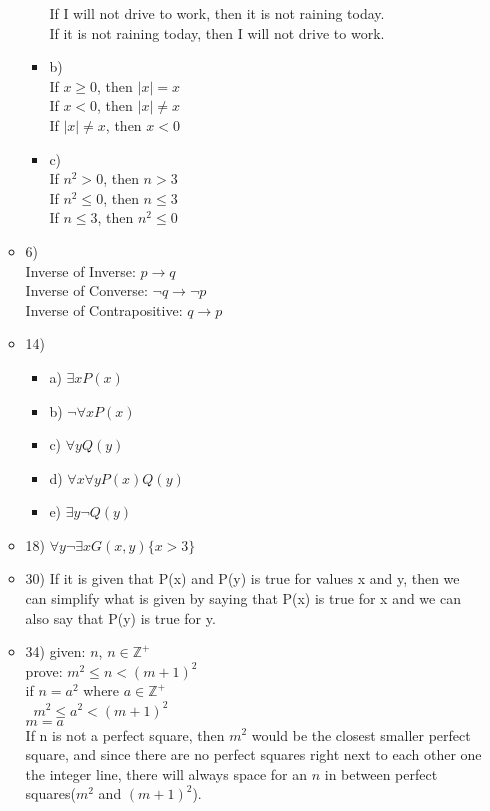 \documentclass{article}
\begin{document}
\begin{itemize}
\begin{itemize}
\begin{itemize}
      If I will not drive to work, then it is not raining today.\\
      If it is not raining today, then I will not drive to work.
      \item
      b)\\
      If $x\ge 0$, then $|x|=x$\\
      If $x< 0$, then $|x|\ne x$\\
      If $|x|\ne x$, then $x<0$
      \item
      c)\\
      If $n^{2}>0$, then $n>3$\\
      If $n^{2}\le 0$, then $n\le 3$\\
      If $n\le 3$, then $n^{2}\le 0$
    \end{itemize}
  \item
  6)\\
  Inverse of Inverse: \hfill $p\to q$\\
  Inverse of Converse: \hfill $\lnot q \to \lnot p$\\
  Inverse of Contrapositive: \hfill $q \to p$
  \item
  14)
  \begin{itemize}
    \item
    a) $\exists xP(x)$
    \item
    b) $\lnot \forall x P(x)$
    \item
    c) $\forall yQ(y)$
    \item
    d) $\forall x\forall y P(x)Q(y)$
    \item
    e) $\exists y\lnot Q(y)$
  \end{itemize}
  \item
  18) $\forall y \lnot \exists xG(x,y)\{x>3\}$
  \item
  30) If it is given that P(x) and P(y) is true for values x and y, then we can simplify what is given by saying that P(x) is true for x and we can also say that P(y) is true for y.
  \item
  34) given: $n$, $n\in \mathbb{Z}^{+}$\\
  prove: $m^{2}\le n<(m+1)^{2}$\\
  if $n=a^{2}$ where $a\in \mathbb{Z}^{+}$\\
  $\;\; m^{2}\le a^{2}<(m+1)^{2}$\\
  $m=a$\\
  If n is not a perfect square, then $m^{2}$ would be the closest smaller perfect square, and since there are no perfect squares right next to each other one the integer line, there will always space for an $n$ in between perfect squares($m^{2}$ and $(m+1)^2$). 

\end{itemize}
\end{itemize}
\end{document}
